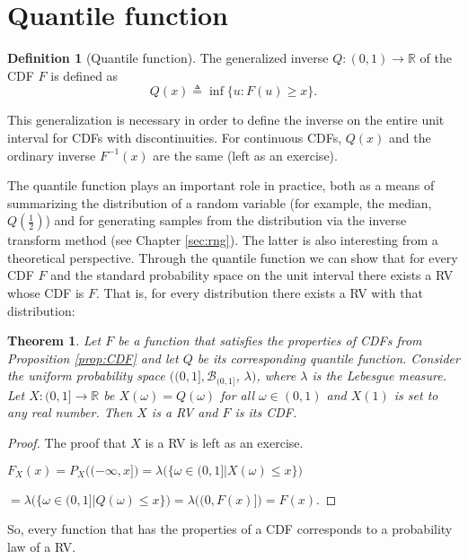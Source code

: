 \documentclass{book}
\theoremstyle{plain}%
\newtheorem{theorem}{Theorem}[section]
\theoremstyle{definition}
\newtheorem{definition}{Definition}[section]
\newlength{\arrow}
\begin{document}
\section{Quantile function}

\begin{definition}[Quantile function]
The generalized inverse $Q: (0, 1) \rightarrow \mathbb{R}$ of the CDF $F$ is defined as
$$Q(x) \triangleq \inf\{u: F(u) \geq x\}.$$\label{def:geninverse}
\end{definition}

This generalization is necessary in order to define the inverse on the entire unit interval for CDFs with discontinuities. For continuous CDFs, $Q(x)$ and the ordinary inverse $F^{-1}(x)$ are the same (left as an exercise).

The quantile function plays an important role in practice, both as a means of summarizing the distribution of a random variable (for example, the median, $Q(\frac{1}{2})$) and for generating samples from the distribution via the inverse transform method (see Chapter \ref{sec:rng}). The latter is also interesting from a theoretical perspective. Through the quantile function we can show that for every CDF $F$ and the standard probability space on the unit interval there exists a RV whose CDF is $F$. That is, for every distribution there exists a RV with that distribution:

\begin{theorem}
Let $F$ be a function that satisfies the properties of CDFs from Proposition \ref{prop:CDF} and let $Q$ be its corresponding quantile function. Consider the uniform probability space $((0,1], \mathcal{B}_{(0,1]}$, $\lambda)$, where $\lambda$ is the Lebesgue measure. Let $X: (0,1] \rightarrow \mathbb{R}$ be $X(\omega) = Q(\omega)$ for all $\omega \in (0, 1)$ and $X(1)$ is set to any real number. Then $X$ is a RV and $F$ is its CDF.\label{thm:CDF-RV}
\end{theorem}

\begin{proof}
The proof that $X$ is a RV is left as an exercise.

$F_X(x) = P_X\bigg((-\infty, x]\bigg) = \lambda\bigg(\{\omega \in (0,1] | X(\omega) \leq x\}\bigg)$

$= \lambda\bigg(\{\omega \in (0,1] | Q(\omega) \leq x\}\bigg) = \lambda\bigg((0, F(x)]\bigg) = F(x).$
\end{proof}

So, every function that has the properties of a CDF corresponds to a probability law of a RV.
\end{document}
